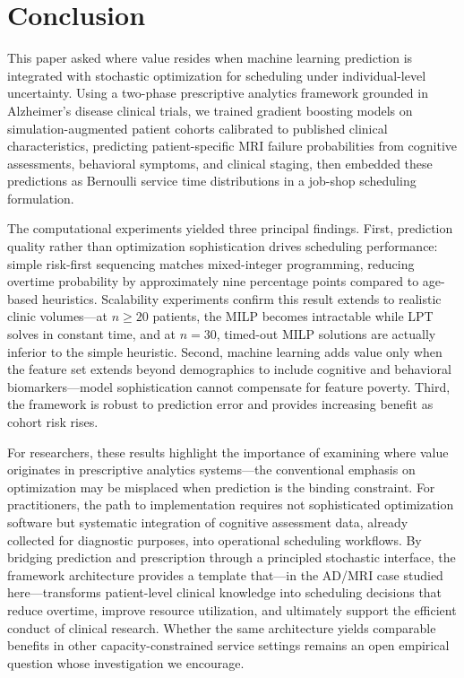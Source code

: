 \documentclass[11pt,a4paper]{article}
\begin{document}

\section{Conclusion}
\label{sec:conclusion}

This paper asked where value resides when machine learning prediction is integrated with stochastic optimization for scheduling under individual-level uncertainty. Using a two-phase prescriptive analytics framework grounded in Alzheimer's disease clinical trials, we trained gradient boosting models on simulation-augmented patient cohorts calibrated to published clinical characteristics, predicting patient-specific MRI failure probabilities from cognitive assessments, behavioral symptoms, and clinical staging, then embedded these predictions as Bernoulli service time distributions in a job-shop scheduling formulation.

The computational experiments yielded three principal findings. First, prediction quality rather than optimization sophistication drives scheduling performance: simple risk-first sequencing matches mixed-integer programming, reducing overtime probability by approximately nine percentage points compared to age-based heuristics. Scalability experiments confirm this result extends to realistic clinic volumes---at $n \geq 20$ patients, the MILP becomes intractable while LPT solves in constant time, and at $n = 30$, timed-out MILP solutions are actually inferior to the simple heuristic. Second, machine learning adds value only when the feature set extends beyond demographics to include cognitive and behavioral biomarkers---model sophistication cannot compensate for feature poverty. Third, the framework is robust to prediction error and provides increasing benefit as cohort risk rises.

For researchers, these results highlight the importance of examining where value originates in prescriptive analytics systems---the conventional emphasis on optimization may be misplaced when prediction is the binding constraint. For practitioners, the path to implementation requires not sophisticated optimization software but systematic integration of cognitive assessment data, already collected for diagnostic purposes, into operational scheduling workflows. By bridging prediction and prescription through a principled stochastic interface, the framework architecture provides a template that---in the AD/MRI case studied here---transforms patient-level clinical knowledge into scheduling decisions that reduce overtime, improve resource utilization, and ultimately support the efficient conduct of clinical research. Whether the same architecture yields comparable benefits in other capacity-constrained service settings remains an open empirical question whose investigation we encourage.

\newpage

\end{document}
